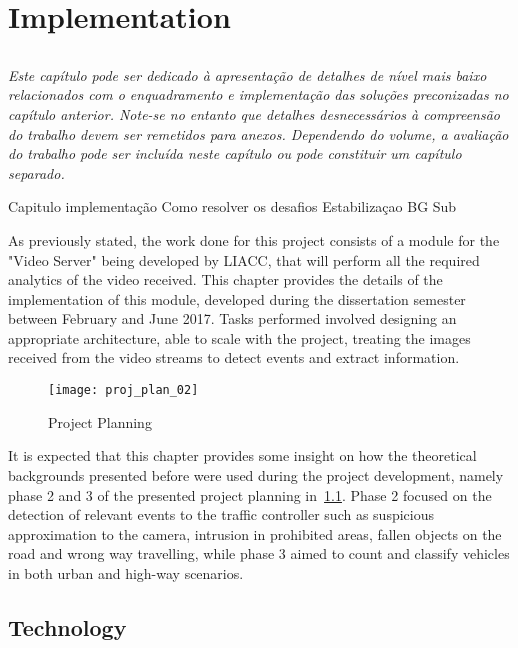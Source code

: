
\chapter{Implementation}\label{chap:chap4}
\section*{}

\textit{
Este capítulo pode ser dedicado à apresentação de detalhes de nível
mais baixo relacionados com o enquadramento e implementação das
soluções preconizadas no capítulo anterior.
Note-se no entanto que detalhes desnecessários à compreensão do
trabalho devem ser remetidos para anexos.
Dependendo do volume, a avaliação do trabalho pode ser incluída neste
capítulo ou pode constituir um capítulo separado.
}


Capitulo implementação
Como resolver os desafios 
  Estabilizaçao BG Sub


As previously stated, the work done for this project consists of a module for the "Video Server" being developed by LIACC, that will perform all the required analytics of the video received. This chapter provides the details of the implementation of this module, developed during the dissertation semester between February and June 2017. Tasks performed involved designing an appropriate architecture, able to scale with the project, treating the images received from the video streams to detect events and extract information. 

\begin{figure}[h]
  \begin{center}
    \leavevmode
    \texttt{[image: proj\_plan\_02]}
    \caption{Project Planning}
    \label{fig:proj_plan}
  \end{center}
\end{figure}


It is expected that this chapter provides some insight on how the theoretical backgrounds presented before were used during the project development, namely phase 2 and 3 of the presented project planning in~\ref{fig:proj_plan}. Phase 2 focused on the detection of relevant events to the traffic controller such as suspicious approximation to the camera, intrusion in prohibited areas, fallen objects on the road and wrong way travelling, while phase 3 aimed to count and classify vehicles in both urban and high-way scenarios.

\section{Technology}

